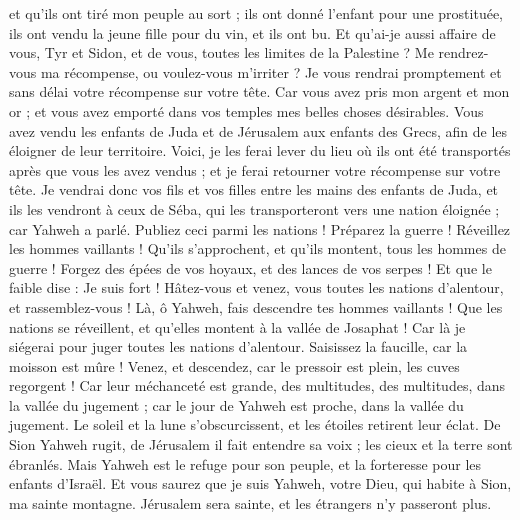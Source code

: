 \begin{multicols}{2}
et qu'ils ont tiré mon peuple au sort ; ils ont donné l'enfant pour une prostituée, ils ont vendu la jeune fille pour du vin, et ils ont bu.
Et qu'ai-je aussi affaire de vous, Tyr et Sidon, et de vous, toutes les limites de la Palestine ? Me rendrez-vous ma récompense, ou voulez-vous m'irriter ? Je vous rendrai promptement et sans délai votre récompense sur votre tête.
Car vous avez pris mon argent et mon or ; et vous avez emporté dans vos temples mes belles choses désirables.
Vous avez vendu les enfants de Juda et de Jérusalem aux enfants des Grecs, afin de les éloigner de leur territoire.
Voici, je les ferai lever du lieu où ils ont été transportés après que vous les avez vendus ; et je ferai retourner votre récompense sur votre tête.
Je vendrai donc vos fils et vos filles entre les mains des enfants de Juda, et ils les vendront à ceux de Séba, qui les transporteront vers une nation éloignée ; car Yahweh a parlé.
Publiez ceci parmi les nations ! Préparez la guerre ! Réveillez les hommes vaillants ! Qu'ils s'approchent, et qu'ils montent, tous les hommes de guerre !
Forgez des épées de vos hoyaux, et des lances de vos serpes ! Et que le faible dise : Je suis fort !
Hâtez-vous et venez, vous toutes les nations d'alentour, et rassemblez-vous ! Là, ô Yahweh, fais descendre tes hommes vaillants !
Que les nations se réveillent, et qu'elles montent à la vallée de Josaphat ! Car là je siégerai pour juger toutes les nations d'alentour.
Saisissez la faucille, car la moisson est mûre ! Venez, et descendez, car le pressoir est plein, les cuves regorgent ! Car leur méchanceté est grande,
des multitudes, des multitudes, dans la vallée du jugement ; car le jour de Yahweh est proche, dans la vallée du jugement.
Le soleil et la lune s'obscurcissent, et les étoiles retirent leur éclat.
De Sion Yahweh rugit, de Jérusalem il fait entendre sa voix ; les cieux et la terre sont ébranlés. Mais Yahweh est le refuge pour son peuple, et la forteresse pour les enfants d'Israël.
Et vous saurez que je suis Yahweh, votre Dieu, qui habite à Sion, ma sainte montagne. Jérusalem sera sainte, et les étrangers n'y passeront plus.

\end{multicols}
